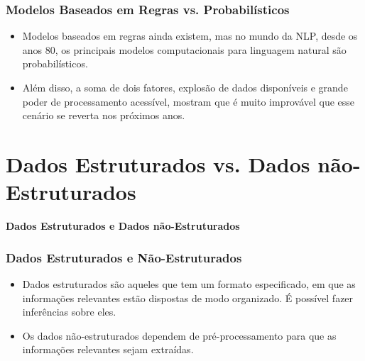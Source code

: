 \documentclass[11pt]{beamer}
\begin{document}
\begin{frame}
\frametitle{Modelos Baseados em Regras vs. Probabilísticos}
\begin{itemize}
	\item Modelos baseados em regras ainda existem, mas no mundo da NLP, desde os anos 80, os principais modelos computacionais para linguagem natural são probabilísticos.\\
	\item Além disso, a soma de dois fatores, explosão de dados disponíveis e grande poder de processamento acessível, mostram que é muito improvável que esse cenário se reverta nos próximos anos.\\
\end{itemize}
\end{frame}

\section{Dados Estruturados vs. Dados não-Estruturados}
\begin{frame}
\begin{center}
\textbf{Dados Estruturados e Dados não-Estruturados}
\end{center}
\end{frame}
\begin{frame}
\frametitle{Dados Estruturados e Não-Estruturados}
\begin{itemize}
	\item Dados estruturados são aqueles que tem um formato especificado, em que as informações relevantes estão dispostas de modo organizado. É possível fazer inferências sobre eles.\\
	\item Os dados não-estruturados dependem de pré-processamento para que as informações relevantes sejam extraídas.\\ 
	
\end{itemize}
\end{frame}
\end{document}
